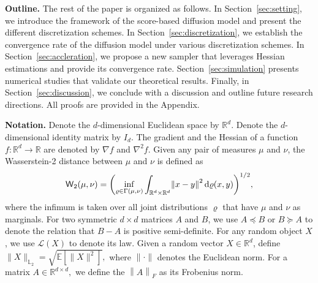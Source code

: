 \documentclass[11pt]{article}
\def\Ltwo{\mathbb L_2}
\def\wass{{\sf W}}
\def\rmd{{\,\rm d}}
\def\l|{\left\lVert}
\def\r|{\right\rVert}
\def\E{\mathbb E}
\def\R{\mathbb R}
\begin{document}
\vspace{0.2cm}
\noindent \textbf{Outline.}
The rest of the paper is organized as follows.
In Section~\ref{sec:setting}, we introduce the framework of the score-based diffusion model and present the different discretization schemes.
In Section~\ref{sec:discretization}, we establish the convergence rate of the diffusion model under various discretization schemes. 
In Section~\ref{sec:accleration}, we propose a new sampler that leverages Hessian estimations and provide its convergence rate.
Section~\ref{sec:simulation} presents numerical studies that validate our theoretical results. 
Finally, in Section~\ref{sec:discussion}, we conclude with a discussion and outline future research directions. 
All proofs are provided in the Appendix.

\vspace{0.2cm}
\noindent \textbf{Notation.} Denote the $d$-dimensional Euclidean space by $\mathbb{R}^d$.
Denote the $d$-dimensional identity matrix by $I_d$. The gradient and the Hessian of a function $f:\mathbb{R}^d\to\mathbb{R}$ are denoted by $\nabla f$ and $\nabla^2f$. 
Given any pair of measures $\mu$ and $\nu$, the Wasserstein-2 distance between $\mu$ and $\nu$ is defined as
\begin{align*}
    \wass_2(\mu,\nu)=\left(\inf_{\varrho\in\Gamma(\mu,\nu)}\int_{\mathbb{R}^d\times\mathbb{R}^d}\l|x-y\r|^2\rmd \varrho(x,y)\right)^{1/2},
\end{align*}
where the infimum is taken over all joint distributions $\varrho$ that have $\mu$ and $\nu$ as marginals. For two symmetric $d\times d$ matrices $A$ and $B$, we use $A\preccurlyeq B$ or $B\succcurlyeq A$ to denote the relation that $B-A$ is positive semi-definite.
For any random object $X$, we use $\mathcal{L}(X)$ to denote its law.
Given a random vector $X\in\R^d$, define $\|X\|_{\Ltwo}=\sqrt{\E[\|X\|^2]},$ where $\|\cdot\|$ denotes the Euclidean norm.
For a matrix $A\in\R^{d\times d},$ we define the  $\l|A\r|_F$ as its Frobenius norm.
\end{document}
